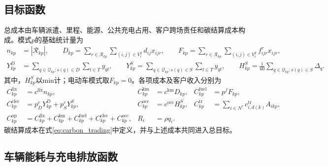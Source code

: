 \documentclass{setp-new}
\begin{document}
\subsection{目标函数}

总成本由车辆派遣、里程、能源、公共充电占用、客户跨场责任和碳结算成本构成。模式$p$的基础统计量为
\begin{equation}
\begin{aligned}
n_{kp}&=|\mathcal R_{kp}|,\qquad
D_{kp}=\sum_{r\in\mathcal R_{kp}}\sum_{(i,j)\in V_r^2}d_{ij}x_{ijr},\qquad
F_{kp}=\sum_{r\in\mathcal R_{kp}}\sum_{(i,j)\in V_r^2}f_{ijr}^\tau x_{ijr},\\
Y_{kp}^D&=\sum_{q\in\mathcal Q_{kp}:s(q)\in D}\sum_{t\in T}y_{qt},\qquad
Y_{kp}^S=\sum_{q\in\mathcal Q_{kp}:s(q)\in S}\sum_{t\in T}y_{qt},\qquad
H_{kp}^S=\frac{1}{60}\sum_{q\in\mathcal Q_{kp}:s(q)\in S}\Delta_q.
\end{aligned}
\label{eq:mode-statistics}
\end{equation}
其中，$H_{kp}^S$以min计；电动车模式取$F_{kp}=0$。各项成本及客户收入分别为
\begin{equation}
\begin{aligned}
C_{kp}^{\mathrm{fix}}&=c^{\mathrm{fix}}n_{kp},&
C_{kp}^{\mathrm{km}}&=c^{\mathrm{km}}D_{kp},&
C_{kp}^{\mathrm{fuel}}&=p^fF_{kp},\\
C_{kp}^{\mathrm{elec}}&=p_D^eY_{kp}^D+p_S^eY_{kp}^S,&
C_{kp}^{\mathrm{occ}}&=c^{\mathrm{occ}}H_{kp}^S,&
C_{kp}^{\mathrm{tr}}&=\sum_{i\in N^\tau}c_{i,d(k)}^{\mathrm{tr}}A_{ikp},\\
C_{kp}^{\mathrm{op}}&=C_{kp}^{\mathrm{fix}}+C_{kp}^{\mathrm{km}}+C_{kp}^{\mathrm{fuel}}+C_{kp}^{\mathrm{elec}}+C_{kp}^{\mathrm{occ}},&
R_i&=\rho q_i.&
\end{aligned}
\label{eq:mode-cost-components}
\end{equation}
碳结算成本在式\eqref{eq:carbon_trading}中定义，并与上述成本共同进入总目标。

\subsection{车辆能耗与充电排放函数}
\end{document}
